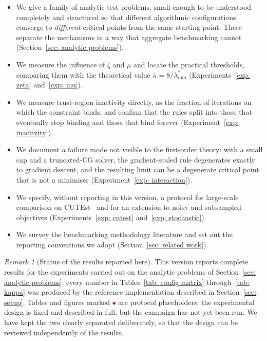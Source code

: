\documentclass[11pt]{article}
\theoremstyle{plain}
\theoremstyle{definition}
\theoremstyle{remark}
\newtheorem{remark}[theorem]{Remark}
\numberwithin{equation}{section}
\newcommand{\placeholder}{\textcolor{red}{$\bullet$}}
\begin{document}
\begin{itemize}[leftmargin=1.6em]
  \item We give a family of analytic test problems, small enough to be understood completely and
        structured so that different algorithmic configurations converge to \emph{different}
        critical points from the same starting point. These separate the mechanisms in a way
        that aggregate benchmarking cannot (Section~\ref{sec: analytic problems}).
  \item We measure the influence of $\zeta$ and $\overline{\mu}$ and locate the practical
        thresholds, comparing them with the theoretical value $\overline{\kappa} =
        8/\lambda^*_{\min}$ (Experiments~\ref{exp: zeta} and~\ref{exp: mu}).
  \item We measure trust-region inactivity directly, as the fraction of iterations on which the
        constraint binds, and confirm that the rules split into those that eventually stop
        binding and those that bind forever (Experiment~\ref{exp: inactivity}).
  \item We document a failure mode not visible to the first-order theory: with a small cap and a
        truncated-CG solver, the gradient-scaled rule degenerates exactly to gradient descent,
        and the resulting limit can be a degenerate critical point that is not a minimiser
        (Experiment~\ref{exp: interaction}).
  \item We specify, without reporting in this version, a protocol for
        large-scale comparison on CUTEst~\citep{GouldOrbanToint15} and for an
        extension to noisy and subsampled objectives
        (Experiments~\ref{exp: cutest} and~\ref{exp: stochastic}).
  \item We survey the benchmarking methodology literature and set out the reporting conventions
        we adopt (Section~\ref{sec: related work}).
\end{itemize}

\begin{remark}[Status of the results reported here]
\label{rem: status}
This version reports complete results for the experiments carried out on the analytic problems
of Section~\ref{sec: analytic problems}; every number in Tables~\ref{tab: config matrix}
through~\ref{tab: kappa} was produced by the reference implementation described in
Section~\ref{sec: setup}. Tables and figures marked \placeholder{} are protocol placeholders:
the experimental design is fixed and described in full, but the campaign has not yet been run.
We have kept the two clearly separated deliberately, so that the design can be reviewed
independently of the results.
\end{remark}
\end{document}
